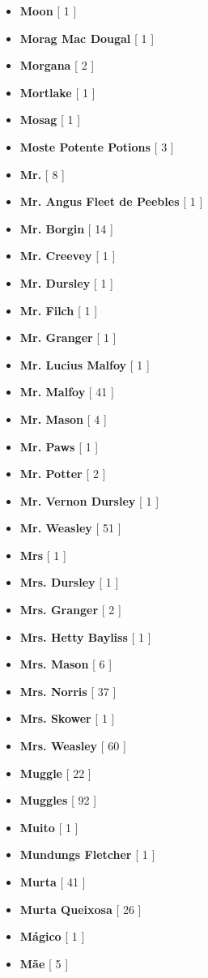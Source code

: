 \documentclass[a4paper]{article}
\begin{document}
\begin{itemize}
	\item \textbf{Moon} [ 1 ]
	\item \textbf{Morag Mac Dougal} [ 1 ]
	\item \textbf{Morgana} [ 2 ]
	\item \textbf{Mortlake} [ 1 ]
	\item \textbf{Mosag} [ 1 ]
	\item \textbf{Moste Potente Potions} [ 3 ]
	\item \textbf{Mr.} [ 8 ]
	\item \textbf{Mr. Angus Fleet de Peebles} [ 1 ]
	\item \textbf{Mr. Borgin} [ 14 ]
	\item \textbf{Mr. Creevey} [ 1 ]
	\item \textbf{Mr. Dursley} [ 1 ]
	\item \textbf{Mr. Filch} [ 1 ]
	\item \textbf{Mr. Granger} [ 1 ]
	\item \textbf{Mr. Lucius Malfoy} [ 1 ]
	\item \textbf{Mr. Malfoy} [ 41 ]
	\item \textbf{Mr. Mason} [ 4 ]
	\item \textbf{Mr. Paws} [ 1 ]
	\item \textbf{Mr. Potter} [ 2 ]
	\item \textbf{Mr. Vernon Dursley} [ 1 ]
	\item \textbf{Mr. Weasley} [ 51 ]
	\item \textbf{Mrs} [ 1 ]
	\item \textbf{Mrs. Dursley} [ 1 ]
	\item \textbf{Mrs. Granger} [ 2 ]
	\item \textbf{Mrs. Hetty Bayliss} [ 1 ]
	\item \textbf{Mrs. Mason} [ 6 ]
	\item \textbf{Mrs. Norris} [ 37 ]
	\item \textbf{Mrs. Skower} [ 1 ]
	\item \textbf{Mrs. Weasley} [ 60 ]
	\item \textbf{Muggle} [ 22 ]
	\item \textbf{Muggles} [ 92 ]
	\item \textbf{Muito} [ 1 ]
	\item \textbf{Mundungs Fletcher} [ 1 ]
	\item \textbf{Murta} [ 41 ]
	\item \textbf{Murta Queixosa} [ 26 ]
	\item \textbf{Mágico} [ 1 ]
	\item \textbf{Mãe} [ 5 ]

\end{itemize}
\end{document}
